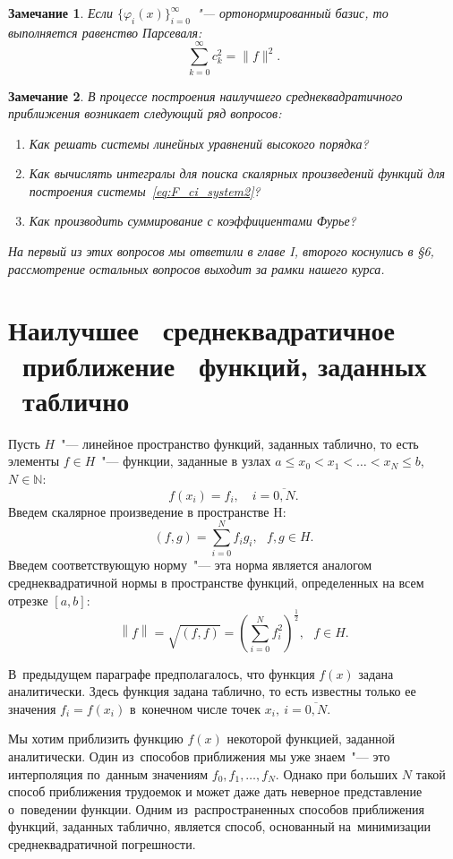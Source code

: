\documentclass[11pt,a4paper,twoside]{report}
\numberwithin{equation}{section}
\theoremstyle{definition}
\theoremstyle{plain}
\newtheorem{note}{Замечание}[section]
\begin{document}
%
%
\begin{note}
%
    Если $\{\varphi_i(x)\}_{i=0}^\infty$~"--- ортонормированный базис, то выполняется
    равенство Парсеваля:
    $$
        \sum_{k=0}^\infty c_k^2 = \|f\|^2.
    $$
\end{note}
%
%
\begin{note}
%
В процессе построения наилучшего среднеквадратичного приближения возникает
следующий ряд вопросов:
\begin{enumerate}
    \item Как решать системы линейных уравнений высокого порядка?
    \item Как вычислять интегралы для поиска скалярных произведений функций
        для построения системы~\eqref{eq:F_ci_system2}?
    \item Как производить суммирование с коэффициентами Фурье?
\end{enumerate}
На первый из этих вопросов мы ответили в главе I, второго коснулись в \S6,
рассмотрение остальных вопросов выходит за рамки нашего курса.
%
\end{note}
%


\section{Наилучшее ~среднеквадратичное ~приближение ~функций, заданных ~таблично}
%

Пусть $H$~"--- линейное пространство функций, заданных таблично, то есть
элементы $f \in H$~"--- функции, заданные в узлах
$a \leqslant x_0<x_1<\ldots<x_N \leqslant b$, $N\in\mathbb{N}$:
%
$$
    f(x_i) = f_i, \quad i = \overline{0,N}.
$$
%
Введем скалярное произведение в пространстве H:
%
$$
    (f,g) = \sum\limits_{i=0}^N f_i g_i,~~~f,g \in H.
$$
%
Введем соответствующую норму~"--- эта норма является аналогом среднеквадратичной
нормы в пространстве функций, определенных на всем отрезке $[a,b]$:
%
$$
    \left\|f\right\| = \sqrt{(f,f)} = \left(\sum_{i=0}^N
    f_i^2\right)^\frac{1}{2},~~~f \in H.
$$
%

В~предыдущем параграфе предполагалось, что функция $f(x)$ задана аналитически.
Здесь функция задана таблично, то есть известны только ее значения $f_i=f(x_i)$
в~конечном числе точек $x_i,~i=\overline{0,N}$.

Мы хотим приблизить функцию $f(x)$ некоторой функцией, заданной аналитически.
Один из~способов приближения мы уже знаем~"--- это интерполяция по~данным
значениям $f_0,f_1,\ldots,f_N$. Однако при больших $N$ такой способ приближения
трудоемок и может даже дать неверное представление о~поведении функции.
Одним из~распространенных способов приближения функций, заданных таблично,
является способ, основанный на~минимизации среднеквадратичной погрешности.
\end{document}
